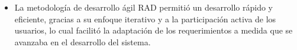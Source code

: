 \begin{itemize}
      \item La metodología de desarrollo ágil RAD permitió un desarrollo rápido y eficiente, gracias a su enfoque iterativo
            y a la participación activa de los usuarios, lo cual facilitó la adaptación de los requerimientos a medida que se
            avanzaba en el desarrollo del sistema.

\end{itemize}